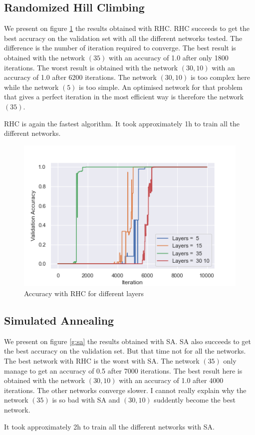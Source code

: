 \documentclass[twocolumn, 10pt]{article}
\begin{document}
		\subsection{Randomized Hill Climbing}
			We present on figure \ref{g:rhc} the results obtained with RHC. RHC succeeds to get the best accuracy on the validation set with all the different networks tested. The difference is the number of iteration required to converge. The best result is obtained with the network $(35)$ with an accuracy of 1.0 after only 1800 iterations. The worst result is obtained with the network $(30, 10)$ with an accuracy of 1.0 after 6200 iterations. The network $(30, 10)$ is too complex here while the network $(5)$ is too simple. An optimised network for that problem that gives a perfect iteration in the most efficient way is therefore the network $(35)$.

			RHC is again the fastest algorithm. It took approximately 1h to train all the different networks.

			\begin{figure}[h]
				\centering
				\includegraphics[width=0.45\linewidth]{../graphics/g_RHC_Iteration_Test_Error_Layers.png}
				\caption{Accuracy with RHC for different layers}
				\label{g:rhc}
			\end{figure}
		\subsection{Simulated Annealing}
			We present on figure \ref{g:sa} the results obtained with SA. SA also succeeds to get the best accuracy on the validation set. But that time not for all the networks. The best network with RHC is the worst with SA. The network $(35)$ only manage to get an accuracy of 0.5 after 7000 iterations. The best result here is obtained with the network $(30, 10)$ with an accuracy of 1.0 after 4000 iterations. The other networks converge slower. I cannot really explain why the network $(35)$ is so bad with SA and $(30, 10)$ suddently become the best network.

			It took approximately 2h to train all the different networks with SA.
\end{document}
